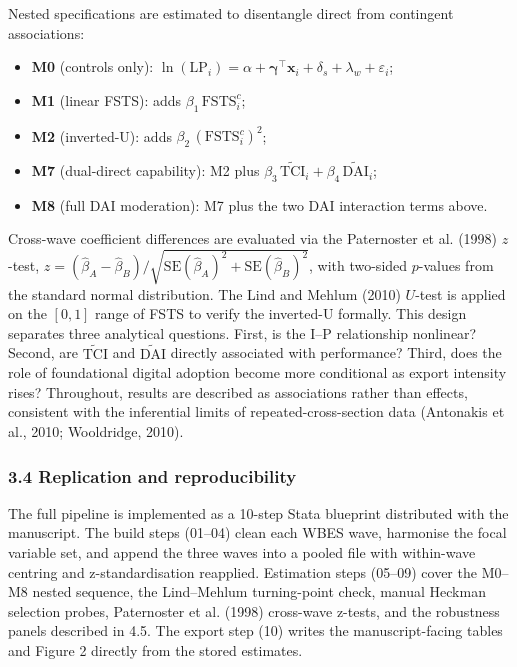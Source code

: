 \documentclass[12pt,a4paper]{article}
\providecommand{\tightlist}{\setlength{\itemsep}{0pt}\setlength{\parskip}{0pt}}
\begin{document}
Nested specifications are estimated to disentangle direct from
contingent associations:

\begin{itemize}
\tightlist
\item
  \textbf{M0} (controls only):
  \(\ln(\mathrm{LP}_i) = \alpha + \boldsymbol{\gamma}^{\top}\!\mathbf{x}_i + \delta_s + \lambda_w + \varepsilon_i\);
\item
  \textbf{M1} (linear FSTS): adds \(\beta_1\,\mathrm{FSTS}^{c}_i\);
\item
  \textbf{M2} (inverted-U): adds \(\beta_2\,(\mathrm{FSTS}^{c}_i)^2\);
\item
  \textbf{M7} (dual-direct capability): M2 plus
  \(\beta_3\,\tilde{\mathrm{TCI}}_i + \beta_4\,\tilde{\mathrm{DAI}}_i\);
\item
  \textbf{M8} (full DAI moderation): M7 plus the two DAI interaction
  terms above.
\end{itemize}

Cross-wave coefficient differences are evaluated via the Paternoster et
al. (1998) \(z\)-test,
\(z = (\hat\beta_A - \hat\beta_B)/\sqrt{\mathrm{SE}(\hat\beta_A)^2 + \mathrm{SE}(\hat\beta_B)^2}\),
with two-sided \(p\)-values from the standard normal distribution. The
Lind and Mehlum (2010) \(U\)-test is applied on the \([0, 1]\) range of
FSTS to verify the inverted-U formally. This design separates three
analytical questions. First, is the I--P relationship nonlinear? Second,
are \(\tilde{\mathrm{TCI}}\) and \(\tilde{\mathrm{DAI}}\) directly
associated with performance? Third, does the role of foundational
digital adoption become more conditional as export intensity rises?
Throughout, results are described as associations rather than effects,
consistent with the inferential limits of repeated-cross-section data
(Antonakis et al., 2010; Wooldridge, 2010).

\hypertarget{34-replication-and-reproducibility}{%
\subsubsection{3.4 Replication and
reproducibility}\label{34-replication-and-reproducibility}}

The full pipeline is implemented as a 10-step Stata blueprint
distributed with the manuscript. The build steps (01--04) clean each
WBES wave, harmonise the focal variable set, and append the three waves
into a pooled file with within-wave centring and z-standardisation
reapplied. Estimation steps (05--09) cover the M0--M8 nested sequence,
the Lind--Mehlum turning-point check, manual Heckman selection probes,
Paternoster et al. (1998) cross-wave z-tests, and the robustness panels
described in 4.5. The export step (10) writes the manuscript-facing
tables and Figure 2 directly from the stored estimates.
\end{document}
